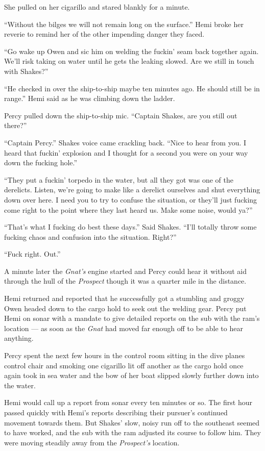 \documentclass[]{scrbook}
\begin{document}
She pulled on her cigarillo and stared blankly for a minute.

``Without the bilges we will not remain long on the surface.'' Hemi
broke her reverie to remind her of the other impending danger they
faced.

``Go wake up Owen and sic him on welding the fuckin' seam back together
again. We'll risk taking on water until he gets the leaking slowed. Are
we still in touch with Shakes?''

``He checked in over the ship-to-ship maybe ten minutes ago. He should
still be in range.'' Hemi said as he was climbing down the ladder.

Percy pulled down the ship-to-ship mic. ``Captain Shakes, are you still
out there?''

``Captain Percy.'' Shakes voice came crackling back. ``Nice to hear from
you. I heard that fuckin' explosion and I thought for a second you were
on your way down the fucking hole.''

``They put a fuckin' torpedo in the water, but all they got was one of
the derelicts. Listen, we're going to make like a derelict ourselves and
shut everything down over here. I need you to try to confuse the
situation, or they'll just fucking come right to the point where they
last heard us. Make some noise, would ya?''

``That's what I fucking do best these days.'' Said Shakes. ``I'll
totally throw some fucking chaos and confusion into the situation.
Right?''

``Fuck right. Out.''

A minute later the \emph{Gnat's} engine started and Percy could hear it
without aid through the hull of the \emph{Prospect} though it was a
quarter mile in the distance.

Hemi returned and reported that he successfully got a stumbling and
groggy Owen headed down to the cargo hold to seek out the welding gear.
Percy put Hemi on sonar with a mandate to give detailed reports on the
sub with the ram's location --- as soon as the \emph{Gnat} had moved far
enough off to be able to hear anything.

Percy spent the next few hours in the control room sitting in the dive
planes control chair and smoking one cigarillo lit off another as the
cargo hold once again took in sea water and the bow of her boat slipped
slowly further down into the water.

Hemi would call up a report from sonar every ten minutes or so. The
first hour passed quickly with Hemi's reports describing their pursuer's
continued movement towards them. But Shakes' slow, noisy run off to the
southeast seemed to have worked, and the sub with the ram adjusted its
course to follow him. They were moving steadily away from the
\emph{Prospect's} location.
\end{document}
